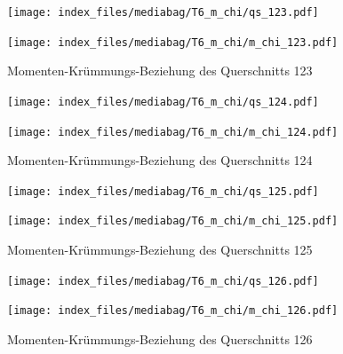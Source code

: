 \documentclass[
  11pt,
  letterpaper,
]{scrreprt}
\begin{document}
\begin{figure}[H]

\begin{minipage}{0.50\linewidth}
\texttt{[image: index\_files/mediabag/T6\_m\_chi/qs\_123.pdf]}\end{minipage}%
%
\begin{minipage}{0.50\linewidth}
\texttt{[image: index\_files/mediabag/T6\_m\_chi/m\_chi\_123.pdf]}\end{minipage}%

\caption{\label{fig-m_chi_appendix}Momenten-Krümmungs-Beziehung des
Querschnitts 123}

\end{figure}%

\begin{figure}[H]

\begin{minipage}{0.50\linewidth}
\texttt{[image: index\_files/mediabag/T6\_m\_chi/qs\_124.pdf]}\end{minipage}%
%
\begin{minipage}{0.50\linewidth}
\texttt{[image: index\_files/mediabag/T6\_m\_chi/m\_chi\_124.pdf]}\end{minipage}%

\caption{\label{fig-m_chi_appendix}Momenten-Krümmungs-Beziehung des
Querschnitts 124}

\end{figure}%

\begin{figure}[H]

\begin{minipage}{0.50\linewidth}
\texttt{[image: index\_files/mediabag/T6\_m\_chi/qs\_125.pdf]}\end{minipage}%
%
\begin{minipage}{0.50\linewidth}
\texttt{[image: index\_files/mediabag/T6\_m\_chi/m\_chi\_125.pdf]}\end{minipage}%

\caption{\label{fig-m_chi_appendix}Momenten-Krümmungs-Beziehung des
Querschnitts 125}

\end{figure}%

\begin{figure}[H]

\begin{minipage}{0.50\linewidth}
\texttt{[image: index\_files/mediabag/T6\_m\_chi/qs\_126.pdf]}\end{minipage}%
%
\begin{minipage}{0.50\linewidth}
\texttt{[image: index\_files/mediabag/T6\_m\_chi/m\_chi\_126.pdf]}\end{minipage}%

\caption{\label{fig-m_chi_appendix}Momenten-Krümmungs-Beziehung des
Querschnitts 126}

\end{figure}%
\end{document}
